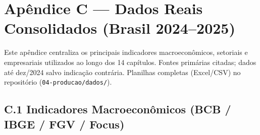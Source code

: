\chapter*{Apêndice C — Dados Reais Consolidados (Brasil 2024–2025)}

Este apêndice centraliza os principais indicadores macroeconômicos, setoriais e empresariais utilizados ao longo dos 14 capítulos. Fontes primárias citadas; dados até dez/2024 salvo indicação contrária. Planilhas completas (Excel/CSV) no repositório (\texttt{04-producao/dados/}).

\section*{C.1 Indicadores Macroeconômicos (BCB / IBGE / FGV / Focus)}

